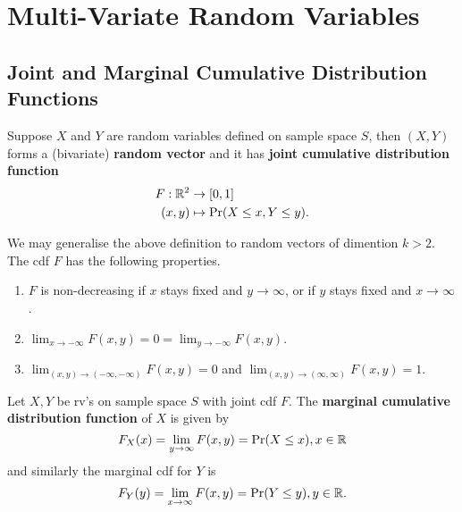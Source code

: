 \documentclass[11pt,fleqn]{book} %
\begin{document}

\chapter{Multi-Variate Random Variables}


\section{Joint and Marginal Cumulative Distribution Functions}

\begin{definition} 
Suppose \(X\) and \(Y\) are random variables defined on sample space \(S\), then \((X, Y)\) forms a (bivariate) \textbf{random vector} and it has \textbf{joint cumulative distribution function}
\[
\begin{aligned}
F: \mathbb{R}^2 &\rightarrow [0, 1] \\
(x, y) &\mapsto \Pr(X \leq x, Y \leq y).
\end{aligned}
\]
\end{definition}

\begin{remark} We may generalise the above definition to random vectors of dimention \(k > 2\). The cdf \(F\) has the following properties.
\begin{enumerate}
\item \(F\) is non-decreasing if \(x\) stays fixed and \(y \rightarrow \infty\), or if \(y\) stays fixed and \(x\rightarrow\infty\).
\item \(\lim_{x\rightarrow-\infty}F(x,y) = 0 = \lim_{y\rightarrow-\infty}F(x, y)\).
\item \(\lim_{(x, y)\rightarrow(-\infty, -\infty)}F(x, y) = 0\) and \(\lim_{(x, y)\rightarrow(\infty, \infty)}F(x, y) = 1\).
\end{enumerate}
\end{remark}

\begin{definition} 
Let \(X, Y\) be rv's on sample space \(S\) with joint cdf \(F\). The \textbf{marginal cumulative distribution function} of \(X\) is given by
\[
F_X(x) = \lim_{y\rightarrow\infty}F(x, y) = \Pr(X \leq x), x \in \mathbb{R}
\]
and similarly the marginal cdf for \(Y\) is
\[
F_Y(y) = \lim_{x\rightarrow\infty}F(x, y) = \Pr(Y \leq y), y \in \mathbb{R}.
\]
\end{definition}
\end{document}
